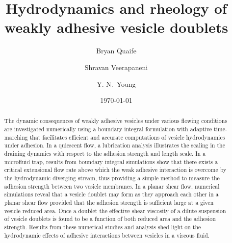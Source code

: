 \documentclass[prf,superscriptaddress,showpacs]{revtex4-1}
\begin{document}

\title{Hydrodynamics and rheology of weakly adhesive vesicle doublets}

\author{Bryan Quaife}
\author{Shravan Veerapaneni}%
%
\author{Y.-N.~Young}%
%

\date{\today}%

\begin{abstract}

The dynamic consequences of weakly adhesive vesicles under various flowing conditions are investigated numerically using a boundary integral formulation with
adaptive time-marching that facilitates efficient and accurate computations of vesicle hydrodynamics under adhesion. In a quiescent flow, a lubrication analysis illustrates the scaling in 
the draining dynamics with respect to the adhesion strength and length scale. In a microfluid trap, results from boundary integral simulations show that there exists a critical extensional flow rate above which the weak adhesive interaction is overcome by the hydrodynamic diverging stream, thus providing a simple method to measure the adhesion strength between two vesicle membranes. In a planar shear flow, numerical simulations reveal that a vesicle doublet may form as they approach each other in a planar shear flow provided that the adhesion
strength is sufficient large at a given vesicle reduced area. Once a doublet the effective shear viscosity of a dilute suspension of vesicle doublets is found 
to be a function of both reduced area and the adhesion strength.
Results from these numerical studies and analysis shed light on the hydrodynamic effects of adhesive interactions between vesicles in a viscous fluid.
\end{abstract}
\end{document}
